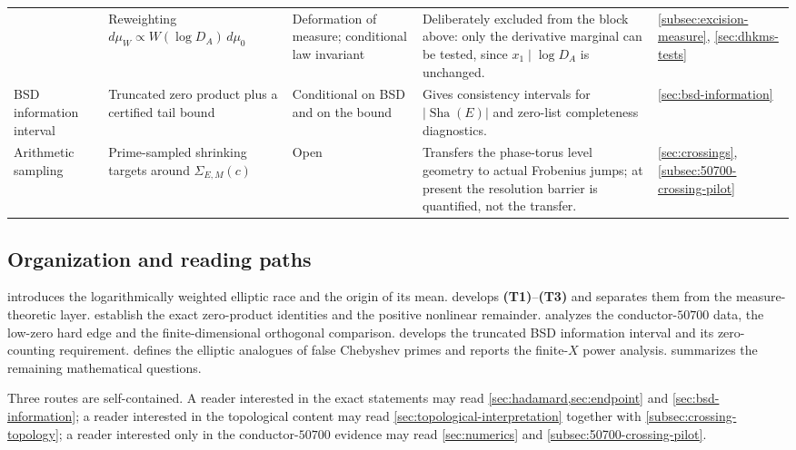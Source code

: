\documentclass[11pt,reqno]{amsart}
\theoremstyle{remark}
\newcommand{\ShaE}{\mathop{\mathrm{Sha}}}
\begin{document}
\begin{table}[H]
\begin{tabularx}{\textwidth}{@{}P{2.45cm}P{3.05cm}P{2.35cm}>{\raggedright\arraybackslash}X P{1.35cm}@{}}
  & Reweighting $d\mu_W\propto W(\log D_A)\,d\mu_0$
  & Deformation of measure; conditional law invariant
  & Deliberately excluded from the block above: only the derivative marginal can be tested, since $x_1\mid\log D_A$ is unchanged.
  & \ref{subsec:excision-measure}, \ref{sec:dhkms-tests}\\
\addlinespace[3pt]
BSD information interval
  & Truncated zero product plus a certified tail bound
  & Conditional on BSD and on the bound
  & Gives consistency intervals for $|\ShaE(E)|$ and zero-list completeness diagnostics.
  & \ref{sec:bsd-information}\\
\addlinespace[3pt]
Arithmetic sampling
  & Prime-sampled shrinking targets around $\Sigma_{E,M}(c)$
  & Open
  & Transfers the phase-torus level geometry to actual Frobenius jumps; at present the resolution barrier is quantified, not the transfer.
  & \ref{sec:crossings}, \ref{subsec:50700-crossing-pilot}\\
\bottomrule
\end{tabularx}
\end{table}

\subsection{Organization and reading paths}
 introduces the logarithmically weighted elliptic race and the origin of its mean.   develops \textbf{(T1)}--\textbf{(T3)} and separates them from the measure-theoretic layer.   establish the exact zero-product identities and the positive nonlinear remainder.   analyzes the conductor-$50700$ data, the low-zero hard edge and the finite-dimensional orthogonal comparison.   develops the truncated BSD information interval and its zero-counting requirement.   defines the elliptic analogues of false Chebyshev primes and reports the finite-$X$ power analysis.   summarizes the remaining mathematical questions.

Three routes are self-contained.  A reader interested in the exact statements may read \cref{sec:hadamard,sec:endpoint} and \cref{sec:bsd-information}; a reader interested in the topological content may read \cref{sec:topological-interpretation} together with \cref{subsec:crossing-topology}; a reader interested only in the conductor-$50700$ evidence may read \cref{sec:numerics} and \cref{subsec:50700-crossing-pilot}.
\end{document}
